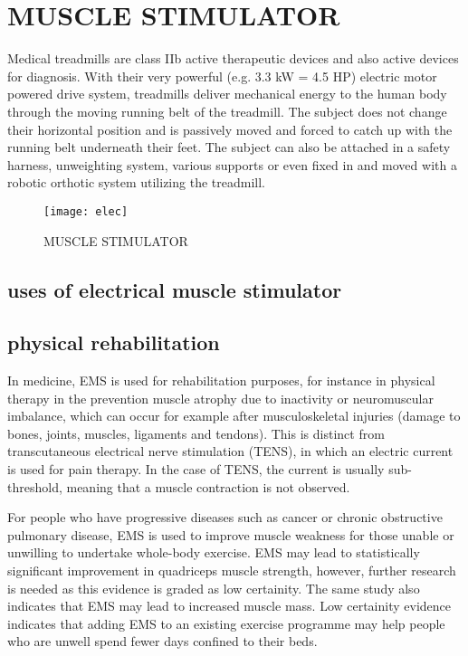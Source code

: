 \documentclass[12pt]{article}
\begin{document}
             
             
             
      
\section{MUSCLE STIMULATOR }
Medical treadmills are class IIb active therapeutic devices and also active devices for diagnosis. With their very powerful (e.g. 3.3 kW = 4.5 HP) electric motor powered drive system, treadmills deliver mechanical energy to the human body through the moving running belt of the treadmill. The subject does not change their horizontal position and is passively moved and forced to catch up with the running belt underneath their feet. The subject can also be attached in a safety harness, unweighting system, various supports or even fixed in and moved with a robotic orthotic system utilizing the treadmill.




\begin{figure}
    \centering
    \texttt{[image: elec]}
    \caption{MUSCLE STIMULATOR}
    \label{fig_elec.}
\end{figure}

\subsection{uses of electrical muscle stimulator }



\subsection{physical rehabilitation}
In medicine, EMS is used for rehabilitation purposes, for instance in physical therapy in the prevention muscle atrophy due to inactivity or neuromuscular imbalance, which can occur for example after musculoskeletal injuries (damage to bones, joints, muscles, ligaments and tendons). This is distinct from transcutaneous electrical nerve stimulation (TENS), in which an electric current is used for pain therapy. In the case of TENS, the current is usually sub-threshold, meaning that a muscle contraction is not observed.

For people who have progressive diseases such as cancer or chronic obstructive pulmonary disease, EMS is used to improve muscle weakness for those unable or unwilling to undertake whole-body exercise. EMS may lead to statistically significant improvement in quadriceps muscle strength, however, further research is needed as this evidence is graded as low certainity. The same study also indicates that EMS may lead to increased muscle mass. Low certainity evidence indicates that adding EMS to an existing exercise programme may help people who are unwell spend fewer days confined to their beds.
\end{document}
